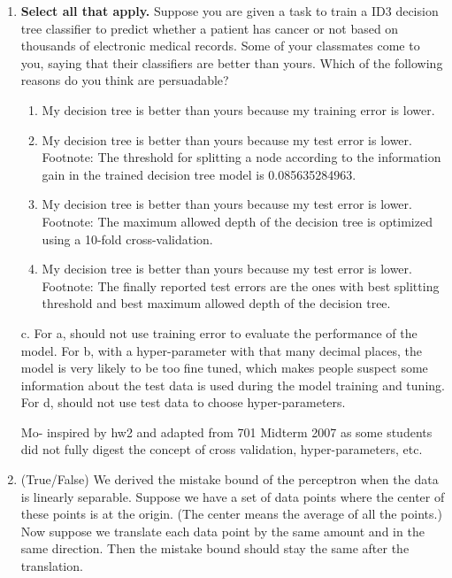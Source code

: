 \begin{enumerate}
    
    \item{} \textbf{Select all that apply.} Suppose you are given a task to train a ID3 decision tree classifier to predict whether a patient has cancer or not based on thousands of electronic medical records. Some of your classmates come to you, saying that their classifiers are better than yours. Which of the following reasons do you think are persuadable? 
    \begin{enumerate}
    \item My decision tree is better than yours because my training error is lower. 
    \item My decision tree is better than yours because my test error is lower. Footnote: The threshold for splitting a node according to the information gain in the trained decision tree model is 0.085635284963. 
    \item My decision tree is better than yours because my test error is lower. Footnote: The maximum allowed depth of the decision tree is optimized using a 10-fold cross-validation. 
    \item My decision tree is better than yours because my test error is lower. Footnote: The finally reported test errors are the ones with best splitting threshold and best maximum allowed depth of the decision tree. 
    \end{enumerate}
    
    \begin{soln}
    c. For a, should not use training error to evaluate the performance of the model. For b, with a hyper-parameter with that many decimal places, the model is very likely to be too fine tuned, which makes people suspect some information about the test data is used during the model training and tuning. For d, should not use test data to choose hyper-parameters. 
    \end{soln}
    
    \begin{qauthor}
    Mo- inspired by hw2 and adapted from 701 Midterm 2007 as some students did not fully digest the concept of cross validation, hyper-parameters, etc. 
    \end{qauthor}
    
    \item (True/False) We derived the mistake bound of the perceptron when the data is linearly separable. Suppose we have a set of data points where the center of these points is at the origin. (The center means the average of all the points.) Now suppose we translate each data point by the same amount and in the same direction. Then the mistake bound should stay the same after the translation.
    

\end{enumerate}
